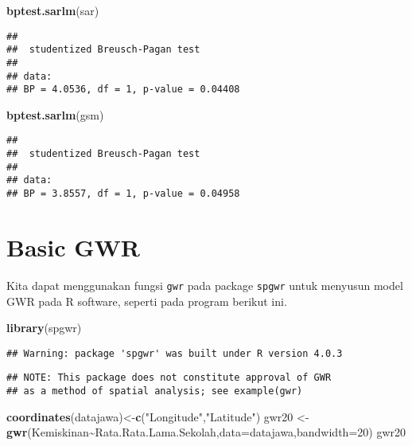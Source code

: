 \documentclass[
]{book}
\newenvironment{Shaded}{\begin{snugshade}}{\end{snugshade}}
\newcommand{\DataTypeTok}[1]{\textcolor[rgb]{0.13,0.29,0.53}{#1}}
\newcommand{\DecValTok}[1]{\textcolor[rgb]{0.00,0.00,0.81}{#1}}
\newcommand{\KeywordTok}[1]{\textcolor[rgb]{0.13,0.29,0.53}{\textbf{#1}}}
\newcommand{\NormalTok}[1]{#1}
\newcommand{\OperatorTok}[1]{\textcolor[rgb]{0.81,0.36,0.00}{\textbf{#1}}}
\newcommand{\StringTok}[1]{\textcolor[rgb]{0.31,0.60,0.02}{#1}}
\begin{document}
\begin{Shaded}
\begin{Highlighting}[]
\KeywordTok{bptest.sarlm}\NormalTok{(sar)}
\end{Highlighting}
\end{Shaded}

\begin{verbatim}
## 
##  studentized Breusch-Pagan test
## 
## data:  
## BP = 4.0536, df = 1, p-value = 0.04408
\end{verbatim}

\begin{Shaded}
\begin{Highlighting}[]
\KeywordTok{bptest.sarlm}\NormalTok{(gsm)}
\end{Highlighting}
\end{Shaded}

\begin{verbatim}
## 
##  studentized Breusch-Pagan test
## 
## data:  
## BP = 3.8557, df = 1, p-value = 0.04958
\end{verbatim}

\hypertarget{basic-gwr}{%
\section{Basic GWR}\label{basic-gwr}}

Kita dapat menggunakan fungsi \texttt{gwr} pada package \texttt{spgwr} untuk menyusun model GWR pada R software, seperti pada program berikut ini.

\begin{Shaded}
\begin{Highlighting}[]
\KeywordTok{library}\NormalTok{(spgwr)}
\end{Highlighting}
\end{Shaded}

\begin{verbatim}
## Warning: package 'spgwr' was built under R version 4.0.3
\end{verbatim}

\begin{verbatim}
## NOTE: This package does not constitute approval of GWR
## as a method of spatial analysis; see example(gwr)
\end{verbatim}

\begin{Shaded}
\begin{Highlighting}[]
\KeywordTok{coordinates}\NormalTok{(datajawa)\textless{}{-}}\KeywordTok{c}\NormalTok{(}\StringTok{"Longitude"}\NormalTok{,}\StringTok{"Latitude"}\NormalTok{)}
\NormalTok{gwr20 \textless{}{-}}\StringTok{ }\KeywordTok{gwr}\NormalTok{(Kemiskinan}\OperatorTok{\textasciitilde{}}\NormalTok{Rata.Rata.Lama.Sekolah,}\DataTypeTok{data=}\NormalTok{datajawa,}\DataTypeTok{bandwidth=}\DecValTok{20}\NormalTok{)}
\NormalTok{gwr20}
\end{Highlighting}
\end{Shaded}
\end{document}
